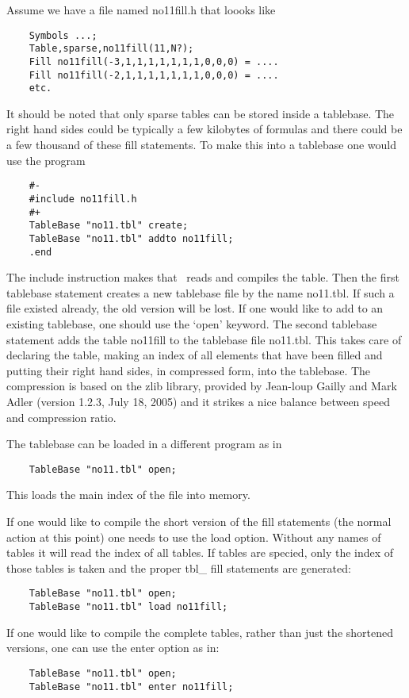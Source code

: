 Assume we have a file named no11fill.h that loooks like
\begin{verbatim}
    Symbols ...;
    Table,sparse,no11fill(11,N?);
    Fill no11fill(-3,1,1,1,1,1,1,1,0,0,0) = ....
    Fill no11fill(-2,1,1,1,1,1,1,1,0,0,0) = ....
    etc.
\end{verbatim}
It should be noted that only sparse tables can be stored 
inside a tablebase. The right hand sides could be typically a few kilobytes 
of formulas and there could be a few thousand of these fill statements. To 
make this into a tablebase one would use the program
\begin{verbatim}
    #-
    #include no11fill.h
    #+
    TableBase "no11.tbl" create;
    TableBase "no11.tbl" addto no11fill;
    .end
\end{verbatim}
The include instruction makes that \FORM\ reads and compiles 
the table. Then the first tablebase statement creates a new tablebase file 
by the name no11.tbl. If such a file existed already, the old version will 
be lost. If one would like to add to an existing tablebase, one should use 
the `open' keyword. The second tablebase statement adds the 
table no11fill to the tablebase file no11.tbl. This takes care of declaring 
the table, making an index of all elements that have been filled and 
putting their right hand sides, in compressed form, into the tablebase. The 
compression is based on the zlib library, provided by Jean-loup 
Gailly and Mark Adler (version 
1.2.3, July 18, 2005) and it strikes a nice balance between speed and 
compression ratio.

The tablebase can be loaded in a different program as in
\begin{verbatim}
    TableBase "no11.tbl" open;
\end{verbatim}
This loads the main index of the file into memory.

If one would like to compile the short version of the fill statements (the 
normal action at this point) one needs to use the load option. 
Without any names of tables it will read the index of all tables. If tables 
are specied, only the index of those tables is taken and the proper 
tbl\_ fill statements are generated:
\begin{verbatim}
    TableBase "no11.tbl" open;
    TableBase "no11.tbl" load no11fill;
\end{verbatim}

If one would like to compile the complete tables, rather 
than just the shortened versions, one can use the enter option as in:
\begin{verbatim}
    TableBase "no11.tbl" open;
    TableBase "no11.tbl" enter no11fill;
\end{verbatim}

